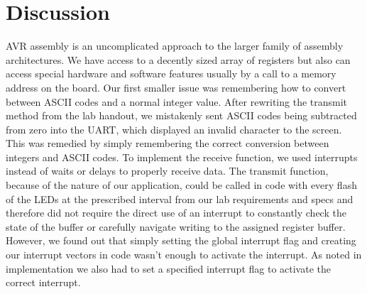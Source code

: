 \documentclass[letterpaper,11pt]{texMemo} %
\begin{document}
\section*{Discussion}
AVR assembly is an uncomplicated approach to the larger family of assembly architectures. We have access to a decently sized array of registers but also can access special hardware and software features usually by a call to a memory address on the board.
Our first smaller issue was remembering how to convert between ASCII codes and a normal integer value. After rewriting the transmit method from the lab handout, we mistakenly sent ASCII codes being subtracted from zero into the UART, which displayed an invalid character to the screen. This was remedied by simply remembering the correct conversion between integers and ASCII codes.
To implement the receive function, we used interrupts instead of waits or delays to properly receive data. The transmit function, because of the nature of our application, could be called in code with every flash of the LEDs at the prescribed interval from our lab requirements and specs and therefore did not require the direct use of an interrupt to constantly check the state of the buffer or carefully navigate writing to the assigned register buffer.  However, we found out that simply setting the global interrupt flag and creating our interrupt vectors in code wasn’t enough to activate the interrupt. As noted in implementation we also had to set a specified interrupt flag to activate the correct interrupt.
\end{document}
